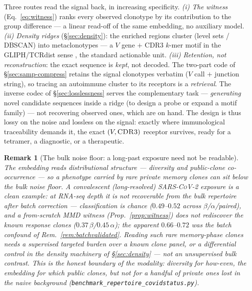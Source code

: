 \documentclass[11pt]{article}
\theoremstyle{oldplain}
\theoremstyle{oldrem}
\newtheorem{remark}{Remark}
\newcommand{\code}[1]{\texttt{#1}}
\begin{document}
Three routes read the signal back, in increasing specificity. \emph{(i) The witness} (Eq.~\eqref{eq:witness})
ranks every observed clonotype by its contribution to the group difference --- a linear read-off of the same
embedding, no auxiliary model. \emph{(ii) Density ridges} (\S\ref{sec:density}): the enriched regions cluster
(level sets / {\scshape DBSCAN}) into metaclonotypes --- a $V$ gene $+$ {\scshape CDR3} $k$-mer motif in the
{\scshape GLIPH}/{\scshape TCR}dist sense \cite{Glanville2017,Dash2017}, the standard actionable unit.
\emph{(iii) Retention, not reconstruction}: the exact sequence is \emph{kept}, not decoded. The two-part code of
\S\ref{sec:samp-compress} retains the signal clonotypes verbatim ($V$ call $+$ junction string), so tracing an
autoimmune cluster to its receptors is a \emph{retrieval}. The inverse codec of \S\ref{sec:losslessness} serves
the complementary task --- \emph{generating} novel candidate sequences inside a ridge (to design a probe or
expand a motif family) --- not recovering observed ones, which are on hand. The design is thus lossy on the
noise and lossless on the signal: exactly where immunological traceability demands it, the exact
$(V,\text{{\scshape CDR3}})$ receptor survives, ready for a tetramer, a diagnostic, or a therapeutic.

\begin{remark}[The bulk noise floor: a long-past exposure need not be readable]\label{rem:bulklimit}
The embedding reads \emph{distributional} structure --- diversity and public-clone co-occurrence --- so a
phenotype carried by rare \emph{private} memory clones can sit below the bulk noise floor. A convalescent
(long-resolved) {\scshape SARS-CoV-2} exposure is a clean example: at {\scshape RNA}-seq depth it is \emph{not}
recoverable from the bulk repertoire after batch correction --- classification is chance ($0.49$--$0.52$ across
$\beta$/$\alpha$/paired), and a from-scratch {\scshape MMD} witness (Prop.~\ref{prop:witness}) does not
rediscover the known response clones ($0.37\,\beta$/$0.45\,\alpha$); the apparent $0.66$--$0.72$ was the batch
confound of Rem.~\ref{rem:batchvalidated}. Reading such rare memory-phase clones needs a \emph{supervised}
targeted burden over a known clone panel, or a differential control in the density machinery of
\S\ref{sec:density} --- not an unsupervised bulk contrast. This is the honest boundary of the modality:
\emph{diversity for how-even, the embedding for which public clones}, but not for a handful of private ones lost
in the naive background (\code{benchmark\_repertoire\_covidstatus.py}).
\end{remark}
\end{document}
